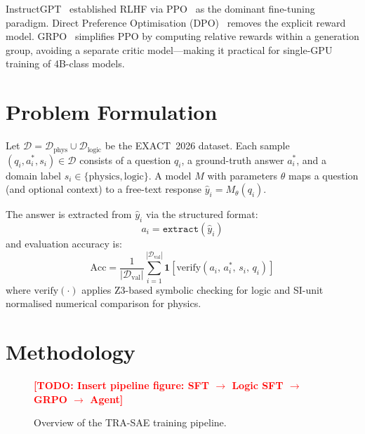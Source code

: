 \documentclass{ieeeaccess}
\newcommand{\todo}[1]{\textcolor{red}{\textbf{[TODO: #1]}}}
\newcommand{\modelname}{\textsc{TRA-SAE}}
\newcommand{\dataset}{EXACT~2026}
\begin{document}
InstructGPT~\cite{Ouyang2022} established RLHF via PPO~\cite{Schulman2017}
as the dominant fine-tuning paradigm.
Direct Preference Optimisation (DPO)~\cite{Rafailov2023} removes the
explicit reward model.
GRPO~\cite{Shao2024} simplifies PPO by computing relative rewards within
a generation group, avoiding a separate critic model—making it practical
for single-GPU training of 4B-class models.

\section{Problem Formulation}
\label{sec:problem}

Let $\mathcal{D} = \mathcal{D}_{\text{phys}} \cup \mathcal{D}_{\text{logic}}$
be the \dataset{} dataset.
Each sample $(q_i, a_i^*, s_i) \in \mathcal{D}$ consists of a question
$q_i$, a ground-truth answer $a_i^*$, and a domain label
$s_i \in \{\text{physics}, \text{logic}\}$.
A model $M$ with parameters $\theta$ maps a question (and optional context) to
a free-text response $\hat{y}_i = M_\theta(q_i)$.

The answer is extracted from $\hat{y}_i$ via the structured format:
\begin{equation}
  a_i = \texttt{extract}(\hat{y}_i)
\end{equation}
and evaluation accuracy is:
\begin{equation}
  \mathrm{Acc} = \frac{1}{|\mathcal{D}_\text{val}|}
  \sum_{i=1}^{|\mathcal{D}_\text{val}|} \mathbf{1}\!\left[
    \mathrm{verify}(a_i,\, a_i^*,\, s_i,\, q_i)
  \right]
\end{equation}
where $\mathrm{verify}(\cdot)$ applies Z3-based symbolic checking for logic
and SI-unit normalised numerical comparison for physics.

\section{Methodology}
\label{sec:method}

\begin{figure}[t]
  \centering
  \todo{Insert pipeline figure: SFT $\to$ Logic SFT $\to$ GRPO $\to$ Agent}
  \caption{Overview of the \modelname{} training pipeline.}
  \label{fig:pipeline}
\end{figure}
\end{document}

